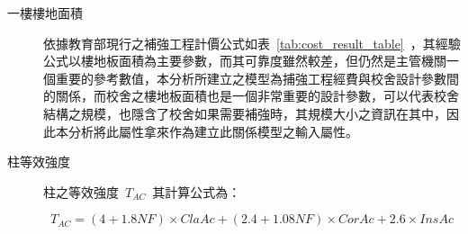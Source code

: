 \begin{description}
  \item[一樓樓地面積]
  依據教育部現行之補強工程計價公式如表~\ref{tab:cost_result_table}~，其經驗公式以樓地板面積為主要參數，而其可靠度雖然較差，但仍然是主管機關一個重要的參考數值，本分析所建立之模型為捕強工程經費與校舍設計參數間的關係，而校舍之樓地板面積也是一個非常重要的設計參數，可以代表校舍結構之規模，也隱含了校舍如果需要補強時，其規模大小之資訊在其中，因此本分析將此屬性拿來作為建立此關係模型之輸入屬性。
  \item[柱等效強度]
  柱之等效強度~$T_{AC}$~其計算公式為：

  \begin{equation}T_{AC} = (4+1.8NF) \times ClaAc+(2.4+1.08NF) \times CorAc+2.6 \times InsAc\end{equation} 


\end{description}
